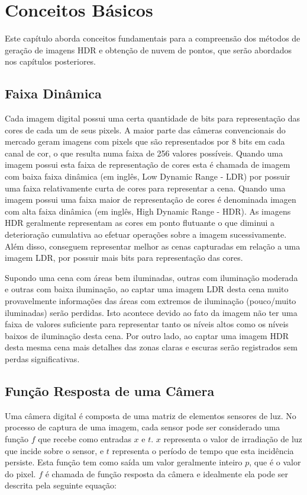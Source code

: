 \chapter{Conceitos Básicos} \label{conceitos}
	Este capítulo aborda conceitos fundamentais para a compreensão dos métodos de geração de imagens HDR e obtenção de nuvem de pontos, que serão abordados nos capítulos posteriores.
	
\section{Faixa Dinâmica} \label{conceitoFaixa}
    Cada imagem digital possui uma certa quantidade de bits para representação das cores de cada um de seus pixels. A maior parte das câmeras convencionais do mercado geram imagens com pixels que são representados por 8 bits em cada canal de cor, o que resulta numa faixa de 256 valores possíveis. Quando uma imagem possui esta faixa de representação de cores esta é chamada de imagem com baixa faixa dinâmica (em inglês, Low Dynamic Range - LDR) por possuir uma faixa relativamente curta de cores para representar a cena. Quando uma imagem possui uma faixa maior de representação de cores é denominada imagen com alta faixa dinâmica (em inglês, High Dynamic Range - HDR). As imagens HDR geralmente representam as cores em ponto flutuante o que diminui a deterioração cumulativa ao efetuar operações sobre a imagem sucessivamente. Além disso, conseguem representar melhor as cenas capturadas em relação a uma imagem LDR, por possuir mais bits para representação das cores.
    
    Supondo uma cena com áreas bem iluminadas, outras com iluminação moderada e outras com baixa iluminação, ao captar uma imagem LDR desta cena muito provavelmente informações das áreas com extremos de iluminação (pouco/muito iluminadas) serão perdidas. Isto acontece devido ao fato da imagem não ter uma faixa de valores suficiente para representar tanto os níveis altos como os níveis baixos de iluminação desta cena. Por outro lado, ao captar uma imagem HDR desta mesma cena mais detalhes das zonas claras e escuras serão registrados sem perdas significativas.
	
\section{Função Resposta de uma Câmera} \label{conceitoFR}
	Uma câmera digital é composta de uma matriz de elementos sensores de luz. No processo de captura de uma imagem, cada sensor pode ser considerado uma função $f$ que recebe como entradas $x$ e $t$. $x$ representa o valor de irradiação de luz que incide sobre o sensor, e $t$ representa o período de tempo que esta incidência persiste. Esta função tem como saída um valor geralmente inteiro $p$, que é o valor do pixel. $f$ é chamada de função resposta da câmera e idealmente ela pode ser descrita pela seguinte equação:
	
